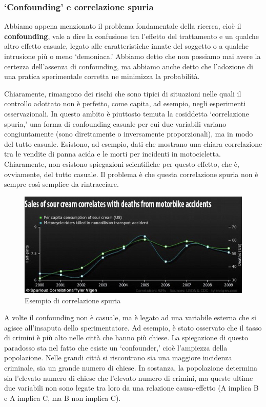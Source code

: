 \documentclass[a4paper,12pt,oneside]{book}
\begin{document}
\hypertarget{confounding-e-correlazione-spuria}{%
\subsubsection{`Confounding' e correlazione spuria}\label{confounding-e-correlazione-spuria}}

Abbiamo appena menzionato il problema fondamentale della ricerca, cioè il \textbf{confounding}, vale a dire la confusione tra l'effetto del trattamento e un qualche altro effetto casuale, legato alle caratteristiche innate del soggetto o a qualche intrusione più o meno `demoniaca.' Abbiamo detto che non possiamo mai avere la certezza dell'assenza di confounding, ma abbiamo anche detto che l'adozione di una pratica sperimentale corretta ne minimizza la probabilità.

Chiaramente, rimangono dei rischi che sono tipici di situazioni nelle quali il controllo adottato non è perfetto, come capita, ad esempio, negli esperimenti osservazionali. In questo ambito è piuttosto temuta la cosiddetta `correlazione spuria,' una forma di confounding casuale per cui due variabili variano congiuntamente (sono direttamente o inversamente proporzionali), ma in modo del tutto casuale. Esistono, ad esempio, dati che mostrano una chiara correlazione tra le vendite di panna acida e le morti per incidenti in motocicletta. Chiaramente, non esistono spiegazioni scientifiche per questo effetto, che è, ovviamente, del tutto casuale. Il problema è che questa correlazione spuria non è sempre così semplice da rintracciare.

\begin{figure}

{\centering \includegraphics[width=0.9\linewidth]{_images/PannaAcida} 

}

\caption{Esempio di correlazione spuria}\label{fig:figName22}
\end{figure}

A volte il confounding non è casuale, ma è legato ad una variabile esterna che si agisce all'insaputa dello sperimentatore. Ad esempio, è stato osservato che il tasso di crimini è più alto nelle città che hanno più chiese. La spiegazione di questo paradosso sta nel fatto che esiste un `confounder,' cioè l'ampiezza della popolazione. Nelle grandi città si riscontrano sia una maggiore incidenza criminale, sia un grande numero di chiese. In sostanza, la popolazione determina sia l'elevato numero di chiese che l'elevato numero di crimini, ma queste ultime due variabili non sono legate tra loro da una relazione causa-effetto (A implica B e A implica C, ma B non implica C).
\end{document}
